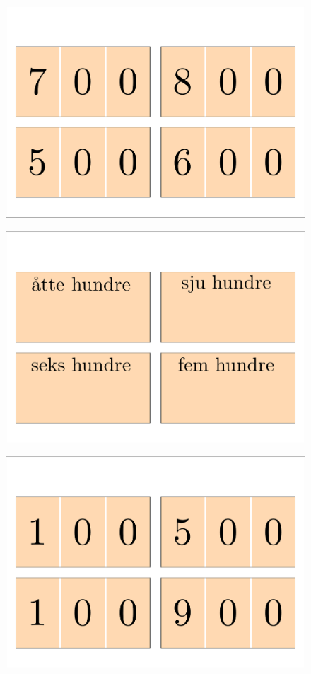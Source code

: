 \begin{figure}
	\centering
	\includegraphics[scale=0.999]{5to8hundreda}
\end{figure}  

\begin{figure}
	\centering
	\includegraphics[scale=0.999]{5to8hundredb}
\end{figure} 

\begin{figure}
	\centering
	\includegraphics[scale=0.999]{900a}
\end{figure} 

